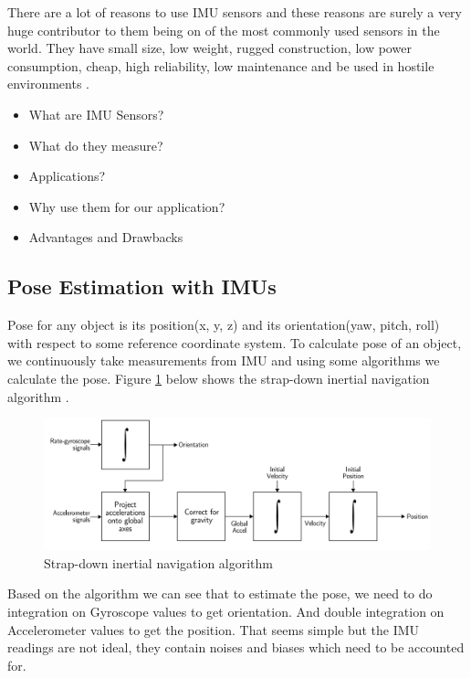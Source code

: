 There are a lot of reasons to use IMU sensors and these reasons are surely a very huge contributor to them being on of the most commonly used sensors in the world. They have small size, low weight, rugged construction, low power consumption, cheap, high reliability, low maintenance and be used in hostile environments \citep{woodman2007introduction}.

\begin{itemize}
\item What are IMU Sensors?
\item What do they measure?
\item Applications?
\item Why use them for our application?
\item Advantages and Drawbacks
\end{itemize}

\subsection{Pose Estimation with IMUs}
Pose for any object is its position(x, y, z) and its orientation(yaw, pitch, roll) with respect to some reference coordinate system. To calculate pose of an object, we continuously take measurements from IMU and using some algorithms we calculate the pose. Figure \ref{fig:strapdown_imu} below shows the strap-down inertial navigation algorithm \citep{woodman2007introduction}.

\begin{figure}
\includegraphics[scale=0.22]{images/fig_chapter1/strap_imu_algo.png}
\caption{Strap-down inertial navigation algorithm}
\label{fig:strapdown_imu}
\end{figure}

Based on the algorithm we can see that to estimate the pose, we need to do integration on Gyroscope values to get orientation. And double integration on Accelerometer values to get the position. That seems simple but the IMU readings are not ideal, they contain noises and biases \citep{woodman2007introduction} which need to be accounted for.

